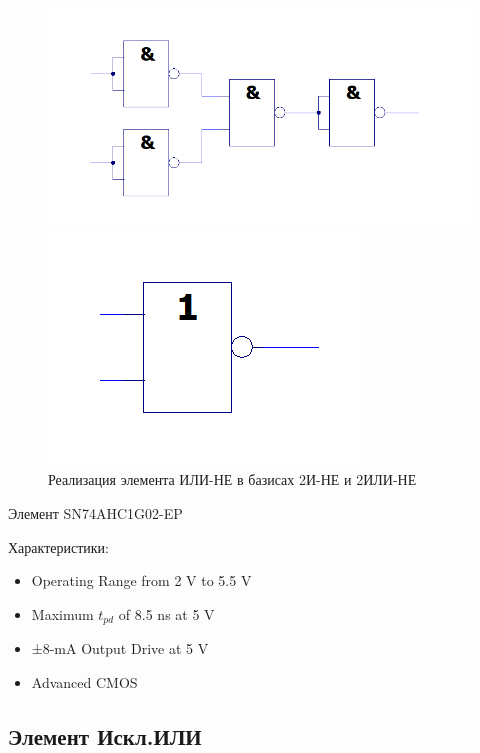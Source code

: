 \begin{figure}[H]
	\centering
	\begin{minipage}{.45\textwidth}
		\centering
		\includegraphics[width=0.85\linewidth]{imgs/1/or-not_and}
	\end{minipage}
	\begin{minipage}{.45\textwidth}
		\centering
		\includegraphics[width=0.85\linewidth]{imgs/1/or-not_or}
	\end{minipage}
	\caption{Реализация элемента ИЛИ-НЕ в базисах 2И-НЕ и 2ИЛИ-НЕ}
\end{figure}

Элемент SN74AHC1G02-EP

Характеристики:
\begin{itemize}
	\item Operating Range from 2 V to 5.5 V
	\item Maximum $t_{pd}$ of 8.5 ns at 5 V
	\item ±8-mA Output Drive at 5 V
	\item Advanced CMOS 
\end{itemize}

\subsection{Элемент Искл.ИЛИ}

